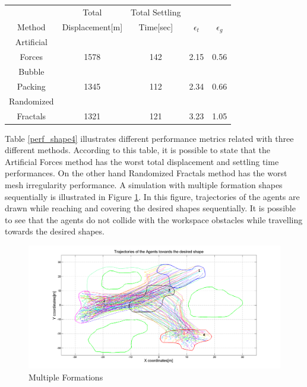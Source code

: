 \newpage	
\begin{center}
 \label{perf_shape4} 
\begin{tabular}{|c|c|c|c|c|}
					
\hline
 &Total  & Total Settling & & \\ Method & Displacement[m] & Time[sec]& \textbf{$\epsilon_t$} & \textbf{$\epsilon_g$} \\
\hline
Artificial&  &  &  & \\
 Forces & 1578 & 142& 2.15 & 0.56\\
 \hline
 Bubble&  &  &  & \\
 Packing &1345 &112 &2.34 & 0.66\\
\hline
 Randomized&  &  &  & \\
 Fractals &1321 &121 &3.23 & 1.05\\
\hline
\end{tabular}
\end{center}

Table \ref{perf_shape4} illustrates different performance metrics related with three different methods. According to this table, it is possible to state that the Artificial Forces method has the worst total displacement and settling time performances. On the other hand Randomized Fractals method has the worst mesh irregularity performance. A simulation with multiple formation shapes sequentially is illustrated in Figure \ref{multiple_formation_ref}. In this figure, trajectories of the agents are drawn while reaching and covering the desired shapes sequentially. It is possible to see that the agents do not collide with the workspace obstacles while travelling towards the desired shapes.

\begin{figure}[H]
\caption{Multiple Formations} \label{multiple_formation_ref}
\centerline{\includegraphics[scale = 0.33]{multiple_formation}}
\end{figure} 
		
